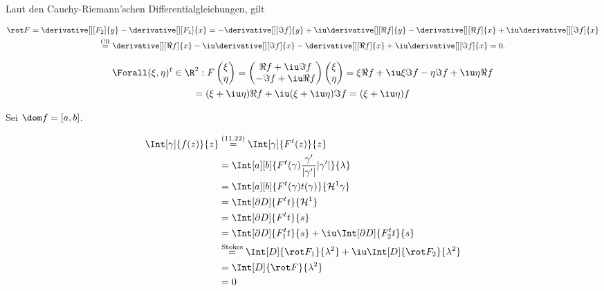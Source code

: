 \begin{solution}

Laut den Cauchy-Riemann'schen Differentialgleichungen, gilt

\begin{multline*}
    \rot F
    =
    \derivative[][F_2]{y}
    -
    \derivative[][F_1]{x}
    =
    -
    \derivative[][\Im f]{y}
    +
    \iu
    \derivative[][\Re f]{y}
    -
    \derivative[][\Re f]{x}
    +
    \iu
    \derivative[][\Im f]{x} \\
    \stackrel
    {
        \text{CR}
    }{=}
    \derivative[][\Re f]{x}
    -
    \iu
    \derivative[][\Im f]{x}
    -
    \derivative[][\Re f]{x}
    +
    \iu
    \derivative[][\Im f]{x}
    =
    0.
\end{multline*}

\begin{multline*}
    \Forall (\xi, \eta)^t \in \R^2:
        F
        \begin{pmatrix}
            \xi \\ \eta
        \end{pmatrix}
        =
        \begin{pmatrix}
            \Re f + \iu \Im f \\
           -\Im f + \iu \Re f
       \end{pmatrix}
       \begin{pmatrix}
        \xi \\ \eta
    \end{pmatrix}
    =
    \xi \Re f + \iu \xi \Im f - \eta \Im f + \iu \eta \Re f \\
    =
    (\xi + \iu \eta) \Re f + \iu (\xi + \iu \eta) \Im f
    =
    (\xi + \iu \eta) f
\end{multline*}


Sei $\dom f = [a, b]$.

\begin{align*}
    \Int[\gamma]
    {
        f(z)
    }{z}
    & \stackrel
    {
        \text{(11.22)}
    }{=}
    \Int[\gamma]
    {
        F^t(z)
    }{z} \\
    & =
    \Int[a][b]
    {
        F^t(\gamma)
        \frac{\gamma^\prime}{|\gamma^\prime|}
        |\gamma^\prime|
    }{\lambda} \\
    & =
    \Int[a][b]
    {
        F^t(\gamma) t(\gamma)
    }{\mathcal H^1 \gamma} \\
    & =
    \Int[\partial D]
    {
        F^t t
    }{\mathcal H^1} \\
    & =
    \Int[\partial D]
    {
        F^t t
    }{s} \\
    & =
    \Int[\partial D]
    {
        F_1^t t
    }{s}
    +
    \iu
    \Int[\partial D]
    {
        F_2^t t
    }{s} \\
    & \stackrel
    {
        \text{Stokes}
    }{=}
    \Int[D]
    {
        \rot F_1
    }{\lambda^2}
    +
    \iu
    \Int[D]
    {
        \rot F_2
    }{\lambda^2} \\
    & =
    \Int[D]
    {
        \rot F
    }{\lambda^2} \\
    & =
    0
\end{align*}


\end{solution}
